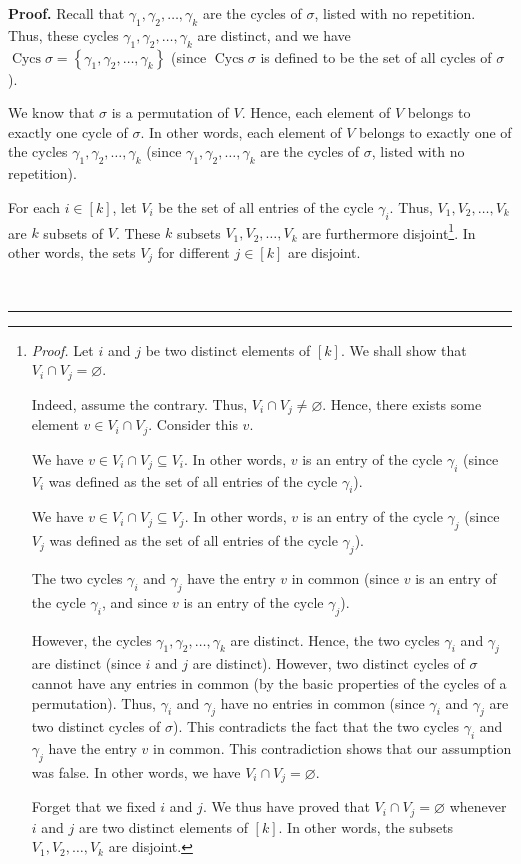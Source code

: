 \documentclass[numbers=enddot,12pt,final,onecolumn,notitlepage]{scrartcl}%
\numberwithin{exer}{section}
\theoremstyle{definition}
\newenvironment{proof}[1][Proof]{\noindent\textbf{#1.} }{\ \rule{0.5em}{0.5em}}
\newenvironment{verlong}{}{}
\begin{document}
\begin{verlong}
\begin{proof}
Recall that $\gamma_{1},\gamma_{2},\ldots,\gamma_{k}$ are the cycles of
$\sigma$, listed with no repetition. Thus, these cycles $\gamma_{1},\gamma
_{2},\ldots,\gamma_{k}$ are distinct, and we have $\operatorname*{Cycs}%
\sigma=\left\{  \gamma_{1},\gamma_{2},\ldots,\gamma_{k}\right\}  $ (since
$\operatorname*{Cycs}\sigma$ is defined to be the set of all cycles of
$\sigma$).

We know that $\sigma$ is a permutation of $V$. Hence, each element of $V$
belongs to exactly one cycle of $\sigma$. In other words, each element of $V$
belongs to exactly one of the cycles $\gamma_{1},\gamma_{2},\ldots,\gamma_{k}$
(since $\gamma_{1},\gamma_{2},\ldots,\gamma_{k}$ are the cycles of $\sigma$,
listed with no repetition).

For each $i\in\left[  k\right]  $, let $V_{i}$ be the set of all entries of
the cycle $\gamma_{i}$. Thus, $V_{1},V_{2},\ldots,V_{k}$ are $k$ subsets of
$V$. These $k$ subsets $V_{1},V_{2},\ldots,V_{k}$ are furthermore
disjoint\footnote{\textit{Proof.} Let $i$ and $j$ be two distinct elements of
$\left[  k\right]  $. We shall show that $V_{i}\cap V_{j}=\varnothing$.
\par
Indeed, assume the contrary. Thus, $V_{i}\cap V_{j}\neq\varnothing$. Hence,
there exists some element $v\in V_{i}\cap V_{j}$. Consider this $v$.
\par
We have $v\in V_{i}\cap V_{j}\subseteq V_{i}$. In other words, $v$ is an entry
of the cycle $\gamma_{i}$ (since $V_{i}$ was defined as the set of all entries
of the cycle $\gamma_{i}$).
\par
We have $v\in V_{i}\cap V_{j}\subseteq V_{j}$. In other words, $v$ is an entry
of the cycle $\gamma_{j}$ (since $V_{j}$ was defined as the set of all entries
of the cycle $\gamma_{j}$).
\par
The two cycles $\gamma_{i}$ and $\gamma_{j}$ have the entry $v$ in common
(since $v$ is an entry of the cycle $\gamma_{i}$, and since $v$ is an entry of
the cycle $\gamma_{j}$).
\par
However, the cycles $\gamma_{1},\gamma_{2},\ldots,\gamma_{k}$ are distinct.
Hence, the two cycles $\gamma_{i}$ and $\gamma_{j}$ are distinct (since $i$
and $j$ are distinct). However, two distinct cycles of $\sigma$ cannot have
any entries in common (by the basic properties of the cycles of a
permutation). Thus, $\gamma_{i}$ and $\gamma_{j}$ have no entries in common
(since $\gamma_{i}$ and $\gamma_{j}$ are two distinct cycles of $\sigma$).
This contradicts the fact that the two cycles $\gamma_{i}$ and $\gamma_{j}$
have the entry $v$ in common. This contradiction shows that our assumption was
false. In other words, we have $V_{i}\cap V_{j}=\varnothing$.
\par
Forget that we fixed $i$ and $j$. We thus have proved that $V_{i}\cap
V_{j}=\varnothing$ whenever $i$ and $j$ are two distinct elements of $\left[
k\right]  $. In other words, the subsets $V_{1},V_{2},\ldots,V_{k}$ are
disjoint.}. In other words, the sets $V_{j}$ for different $j\in\left[
k\right]  $ are disjoint.


\end{proof}
\end{verlong}
\end{document}
